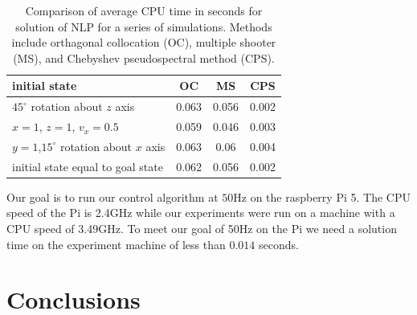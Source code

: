 \documentclass[]{article}
\begin{document}
\begin{table}[h!]	
	\begin{center}
		\begin{tabular}{ | l | c | c | c | } 
			\hline
			initial state & OC  & MS & CPS \\
			\hline
			$45^{\circ}$ rotation about $z$ axis & 0.063 &       0.056 & 0.002 \\ 
			$x = 1$, $z=1$, $v_x = 0.5$  & 0.059          &        0.046 & 0.003 \\ 
			$y = 1$,$15^{\circ}$ rotation about $x$ axis &0.063          &       0.06 & 0.004\\ 
				initial state equal to goal state & 0.062    &            0.056  & 0.002 \\ 
			\hline
		\end{tabular}
		\caption{Comparison of average CPU time in seconds for solution of NLP for a series of  simulations. Methods include orthagonal collocation (OC),  multiple shooter (MS), and Chebyshev pseudospectral method (CPS). }
	\end{center}
\end{table}

Our goal is to run our control algorithm at $50$Hz on the raspberry Pi 5. The CPU speed of the Pi is 2.4GHz while our experiments were run on a machine with a CPU speed of 3.49GHz. To meet our goal of 50Hz on the Pi we need a solution time on the experiment machine of less than $0.014$ seconds.
	\section*{Conclusions}
	
	
	
%	


\end{document}
